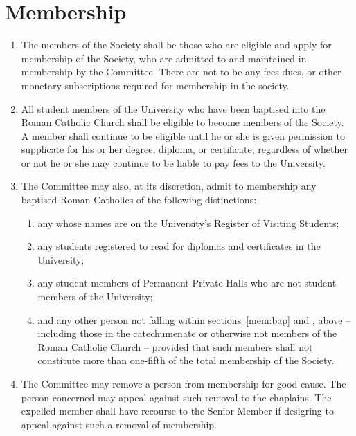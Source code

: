 \documentclass[11pt]{article}
\begin{document}
\section{Membership}\label{con:mem}
\begin{enumerate}
\item The members of the Society shall be those who are eligible and apply for membership of the Society, who are admitted to and maintained in membership by the Committee.  There are not to be any fees dues, or other monetary subscriptions required for membership in the society.
\item \label{mem:bap} All student members of the University who have been baptised into the Roman Catholic Church shall be eligible to become members of the Society. A member shall continue to be eligible until he or she is given permission to supplicate for his or her degree, diploma, or certificate, regardless of whether or not he or she may continue to be liable to pay fees to the University.
\item The Committee may also, at its discretion, admit to membership any baptised Roman Catholics of the following distinctions:
\begin{enumerate}
\item \label{mem:vis} any whose names are on the University's Register of Visiting Students;
\item any students registered to read for diplomas and certificates in the University;
\item \label{mem:non} any student members of Permanent Private Halls who are not student members of the University;
\item \label{mem:oth} and any other person not falling within sections~\cref{mem:bap} and , above -- including those in the catechumenate or otherwise not members of the Roman Catholic Church -- provided that such members shall not constitute more than one-fifth of the total membership of the Society.
\end{enumerate}
\item The Committee may remove a person from membership for good cause. The person concerned may appeal against such removal to the chaplains.  The expelled member shall have recourse to the Senior Member if desigring to appeal against such a removal of membership.
\end{enumerate}
\end{document}
